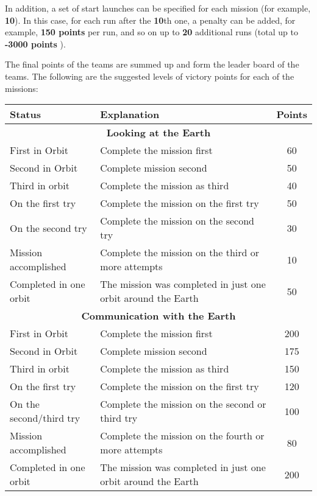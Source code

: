 \documentclass[12pt,a4paper]{article}
\begin{document}
In addition, a set of start launches can be specified for each mission (for example, \textbf{10}). In this case, for each run after the \textbf{10}th one, a penalty can be added, for example, \textbf{150 points} per run, and so on up to \textbf{20} additional runs (total up to \textbf{-3000 points} ).

The final points of the teams are summed up and form the leader board of the teams.
The following are the suggested levels of victory points for each of the missions:

\begin{center}
\begin{longtable}{ |p{5cm}|p{8cm}|c|}
  \hline
  \textbf{Status} & \textbf{Explanation} & \textbf{Points}\\
  \hline
  \endhead
  \multicolumn{3}{|c|}{\textbf{Looking at the Earth}}\\
  \hline
  First in Orbit & Complete the mission first & 60\\
  \hline
  Second in Orbit & Complete mission second & 50\\
   \hline
   Third in orbit & Complete the mission as third & 40\\
   \hline
   On the first try & Complete the mission on the first try & 50\\
   \hline
   On the second try & Complete the mission on the second try & 30\\
   \hline
   Mission accomplished & Complete the mission on the third or more attempts & 10\\
   \hline
   Completed in one orbit & The mission was completed in just one orbit around the Earth & 50\\
  \hline
  \multicolumn{3}{|c|}{\textbf{Communication with the Earth}}\\
  \hline
  First in Orbit & Complete the mission first & 200\\
  \hline
 Second in Orbit & Complete mission second & 175\\
  \hline
  Third in orbit & Complete the mission as third & 150\\
  \hline
  On the first try & Complete the mission on the first try & 120\\
  \hline
  On the second/third try & Complete the mission on the second or third try & 100\\
  \hline
  Mission accomplished & Complete the mission on the fourth or more attempts & 80\\
  \hline
 Completed in one orbit & The mission was completed in just one orbit around the Earth & 200\\

\end{longtable}
\end{center}
\end{document}
